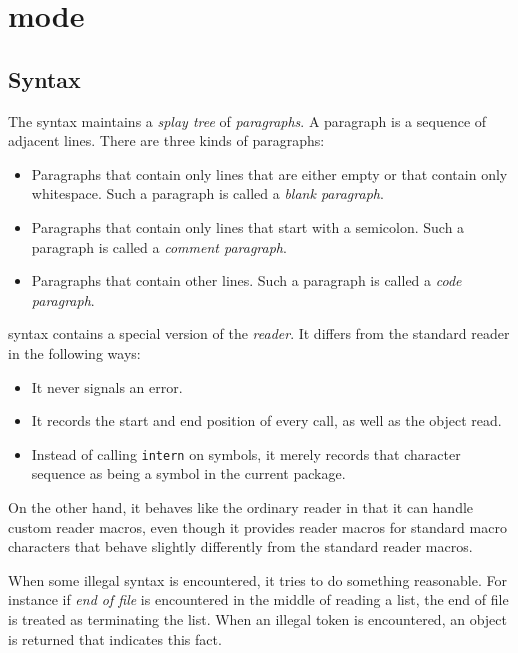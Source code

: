 \chapter{\commonlisp{} mode}
\label{chap-internals-common-lisp-mode}

\section{Syntax}

The \commonlisp{} syntax maintains a \emph{splay tree}
\cite{Sleator:1985:SBS:3828.3835} of \emph{paragraphs}.  A paragraph
is a sequence of adjacent lines. There are three kinds of paragraphs:

\begin{itemize}
\item Paragraphs that contain only lines that are either empty or
  that contain only whitespace.  Such a paragraph is called a
  \emph{blank paragraph}. 
\item Paragraphs that contain only lines that start with a semicolon.
  Such a paragraph is called a \emph{comment paragraph}.
\item Paragraphs that contain other lines.  Such a paragraph is called
  a \emph{code paragraph}.
\end{itemize}

\commonlisp{} syntax contains a special version of the \commonlisp{}
\emph{reader}.  It differs from the standard reader in the following
ways:

\begin{itemize}
\item It never signals an error.
\item It records the start and end position of every call, as well as
  the object read.
\item Instead of calling \texttt{intern} on symbols, it merely records
  that character sequence as being a symbol in the current package. 
\end{itemize}

On the other hand, it behaves like the ordinary \commonlisp{} reader
in that it can handle custom reader macros, even though it provides
reader macros for standard macro characters that behave slightly
differently from the standard reader macros.

When some illegal syntax is encountered, it tries to do something
reasonable.  For instance if \emph{end of file} is encountered in the
middle of reading a list, the end of file is treated as terminating
the list.  When an illegal token is encountered, an object is returned
that indicates this fact. 


